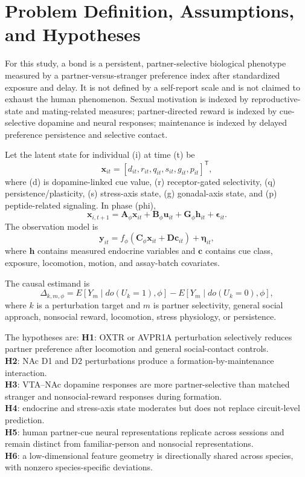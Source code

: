 \documentclass[conference]{IEEEtran}
\begin{document}
\section{Problem Definition, Assumptions, and Hypotheses}
For this study, a bond is a persistent, partner-selective biological phenotype measured by a partner-versus-stranger preference index after standardized exposure and delay. It is not defined by a self-report scale and is not claimed to exhaust the human phenomenon. Sexual motivation is indexed by reproductive-state and mating-related measures; partner-directed reward is indexed by cue-selective dopamine and neural responses; maintenance is indexed by delayed preference persistence and selective contact.

Let the latent state for individual (i) at time (t) be
\begin{equation}
\mathbf{x}_{it}=[d_{it},r_{it},q_{it},s_{it},g_{it},p_{it}]^{\mathsf T},
\end{equation}
where (d) is dopamine-linked cue value, (r) receptor-gated selectivity, (q) persistence/plasticity, (s) stress-axis state, (g) gonadal-axis state, and (p) peptide-related signaling. In phase (phi),
\begin{equation}
\mathbf{x}_{i,t+1}=\mathbf{A}_{\phi}\mathbf{x}_{it}+\mathbf{B}_{\phi}\mathbf{u}_{it}+\mathbf{G}_{\phi}\mathbf{h}_{it}+\boldsymbol{\epsilon}_{it}.
\end{equation}
The observation model is
\begin{equation}
\mathbf{y}_{it}=f_{\phi}(\mathbf{C}_{\phi}\mathbf{x}_{it}+\mathbf{D}\mathbf{c}_{it})+\boldsymbol{\eta}_{it},
\end{equation}
where $\mathbf{h}$ contains measured endocrine variables and $\mathbf{c}$ contains cue class, exposure, locomotion, motion, and assay-batch covariates.

The causal estimand is
\begin{equation}
\Delta_{k,m,\phi}=E[Y_m\mid do(U_k=1),\phi]-E[Y_m\mid do(U_k=0),\phi],
\end{equation}
where $k$ is a perturbation target and $m$ is partner selectivity, general social approach, nonsocial reward, locomotion, stress physiology, or persistence.

The hypotheses are:
\textbf{H1}: OXTR or AVPR1A perturbation selectively reduces partner preference after locomotion and general social-contact controls.\\
\textbf{H2}: NAc D1 and D2 perturbations produce a formation-by-maintenance interaction.\\
\textbf{H3}: VTA--NAc dopamine responses are more partner-selective than matched stranger and nonsocial-reward responses during formation.\\
\textbf{H4}: endocrine and stress-axis state moderates but does not replace circuit-level prediction.\\
\textbf{H5}: human partner-cue neural representations replicate across sessions and remain distinct from familiar-person and nonsocial representations.\\
\textbf{H6}: a low-dimensional feature geometry is directionally shared across species, with nonzero species-specific deviations.
\end{document}
